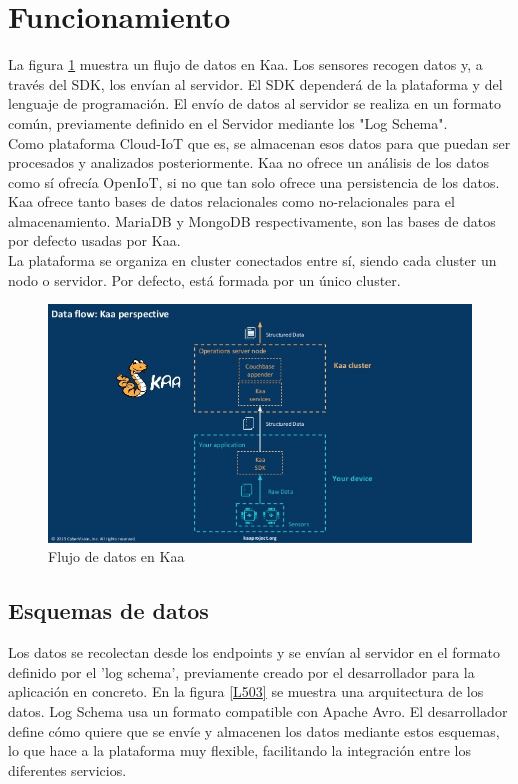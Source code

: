\documentclass[12pt, twoside]{book}
\begin{document}
\section{Funcionamiento}
La figura \ref{L502} muestra un flujo de datos en Kaa. Los sensores recogen datos y, a través del SDK, los envían al servidor. El SDK dependerá de la plataforma y del lenguaje de programación. El envío de datos al servidor se realiza en un formato común, previamente definido en el Servidor mediante los "Log Schema". \\
Como plataforma Cloud-IoT que es, se almacenan esos datos para que puedan ser procesados y analizados posteriormente. Kaa no ofrece un análisis de los datos como sí ofrecía OpenIoT, si no que tan solo ofrece una persistencia de los datos. Kaa ofrece tanto bases de datos relacionales como no-relacionales para el almacenamiento. MariaDB y MongoDB respectivamente, son las bases de datos por defecto usadas por Kaa.\\
La plataforma se organiza en cluster conectados entre sí, siendo cada cluster un nodo o servidor. Por defecto, está formada por un único cluster. 
\begin{figure}[H]
\centering
\includegraphics[scale=0.5]{images/kaa_platform1}
\caption{Flujo de datos en Kaa}\label{L502}
\end{figure} 
\subsection*{Esquemas de datos}
Los datos se recolectan desde los endpoints y se envían al servidor en el formato definido por el 'log schema', previamente creado por el desarrollador para la aplicación en concreto. En la figura \ref{L503} se muestra una arquitectura de los datos. Log Schema usa un formato compatible con Apache Avro. El desarrollador define cómo quiere que se envíe y almacenen los datos mediante estos esquemas, lo que hace a la plataforma muy flexible, facilitando la integración entre los diferentes servicios.\\
\end{document}
